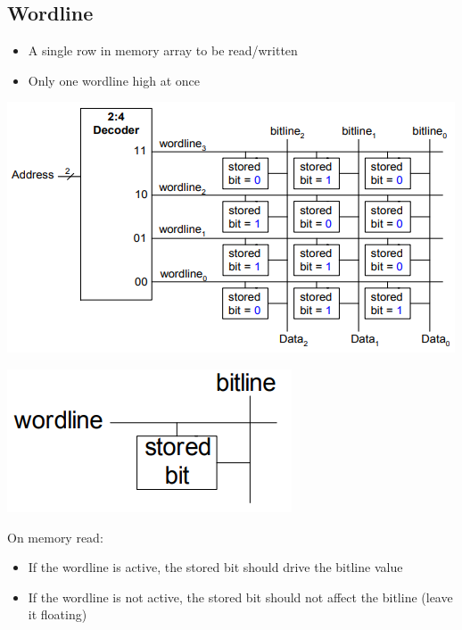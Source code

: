 \documentclass{article}[18pt]
\begin{document}
\subsection{Wordline}
\begin{itemize}
	\item A single row in memory array to be read/written
	\item Only one wordline high at once
\end{itemize}
\begin{center}
	\includegraphics[scale=0.7]{wordline}
\end{center}
\begin{center}
	\includegraphics[scale=0.7]{wordline1}
\end{center}
On memory read:
\begin{itemize}
	\item If the wordline is active, the stored bit should drive the bitline value
	\item If the wordline is not active, the stored bit should not affect the bitline (leave it floating)
\end{itemize}
\end{document}
